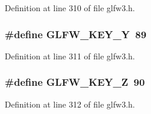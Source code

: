 Definition at line 310 of file glfw3.\+h.

\hypertarget{group__keys_gafd9f115a549effdf8e372a787c360313}{}
\subsubsection[{G\+L\+F\+W\+\_\+\+K\+E\+Y\+\_\+\+Y}]{\setlength{\rightskip}{0pt plus 5cm}\#define G\+L\+F\+W\+\_\+\+K\+E\+Y\+\_\+\+Y~89}\label{group__keys_gafd9f115a549effdf8e372a787c360313}


Definition at line 311 of file glfw3.\+h.

\hypertarget{group__keys_gac489e208c26afda8d4938ed88718760a}{}
\subsubsection[{G\+L\+F\+W\+\_\+\+K\+E\+Y\+\_\+\+Z}]{\setlength{\rightskip}{0pt plus 5cm}\#define G\+L\+F\+W\+\_\+\+K\+E\+Y\+\_\+\+Z~90}\label{group__keys_gac489e208c26afda8d4938ed88718760a}


Definition at line 312 of file glfw3.\+h.

